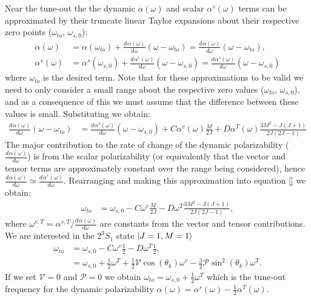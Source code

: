 \documentclass{article}
\newcommand{\difn}[3]{\frac{d^#3 #1}{d #2^#3}}
\begin{document}
Near the tune-out the the dynamic \(\alpha(\omega)\) and scalar \(\alpha^s(\omega)\) terms can be approximated by their truncate linear Taylor expansions about their respective zero points (\(\omega_{to}\), \(\omega_{s,0}\)):
\begin{align}
    \alpha(\omega) &= \alpha(\omega_{to}) + \difn{\alpha(\omega)}{\omega}{{}}(\omega-\omega_{to})=\difn{\alpha(\omega)}{\omega}{{}}(\omega-\omega_{to}), \\
    \alpha^s(\omega) &= \alpha^s(\omega_{s,0}) + \difn{\alpha^s(\omega)}{\omega}{{}}(\omega-\omega_{s,0})= \difn{\alpha^s(\omega)}{\omega}{{}}(\omega-\omega_{s,0})
\end{align}
where \(\omega_{to}\) is the desired term. Note that for these approximations to be valid we need to only consider a small range about the respective zero values (\(\omega_{to}\), \(\omega_{s,0}\)), and as a consequence of this we must assume that the difference between these values is small. Substituting we obtain:
\begin{align}
    \difn{\alpha(\omega)}{\omega}{{}}(\omega-\omega_{to}) &= \difn{\alpha^s(\omega)}{\omega}{{}}(\omega-\omega_{s,0}) + C \alpha^v(\omega) \frac{M}{2J} + D \alpha^T(\omega) \frac{3M^2-J(J+1)}{2J(2J-1)}
\end{align}
The major contribution to the rate of change of the dynamic polarizability (\(\difn{\alpha(\omega)}{\omega}{{}}\)) is from the scalar polarizability (or equivalently that the vector and tensor terms are approximately constant over the range being considered), hence \(\difn{\alpha(\omega)}{\omega}{{}} \simeq \difn{\alpha^s(\omega)}{\omega}{{}}\). Rearranging and making this approximation into equation \ref{} we obtain:
\begin{align}
    \omega_{to} &= \omega_{s,0} - C \omega^v \frac{M}{2J} - D \omega^T \frac{3M^2-J(J+1)}{2J(2J-1)},
\end{align}
where \(\omega^{v,T} = \alpha^{s,T}/\difn{\alpha(\omega)}{\omega}{{}}\) are constants from the vector and tensor contributions. We are interested in the \(2^3S_1\) state \(\ket{J=1,M=1}\)
\begin{align}
    \omega_{to} &= \omega_{s,0} - C \omega^v \frac{1}{2} - D \omega^T \frac{1}{2},\\
    &= \omega_{s,0} + \frac{1}{2} \omega^T + \frac{1}{2} \mathcal{V} \cos \left( \theta_k \right) \omega^v - \frac{3}{2} \mathcal{P} \sin^2(\theta_k) \omega^T.
\end{align}
If we set \(\mathcal{V}=0\) and \(\mathcal{P}=0\) we obtain \(\omega_{to} = \omega_{s,0} + \frac{1}{2} \omega^T\) which is the tune-out frequency for the dynamic polarizability \(\alpha(\omega) = \alpha^s(\omega) - \frac{1}{2}  \alpha^T(\omega)\).
\end{document}
